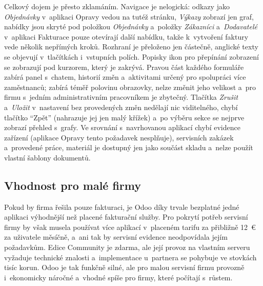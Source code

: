 Celkový dojem je přesto zklamáním. Navigace je nelogická: odkazy jako \emph{Objednávky} v~aplikaci Opravy vedou na tutéž stránku, \emph{Výkazy} zobrazí jen graf, nabídky jsou skryté pod položkou \emph{Objednávky} a~položky \emph{Zákazníci} a~\emph{Dodavatelé} v~aplikaci Fakturace pouze otevírají další nabídku, takže k~vytvoření faktury vede několik nepřímých kroků. Rozhraní je přeloženo jen částečně, anglické texty se objevují v~tlačítkách i~vstupních polích. Popisky ikon pro přepínání zobrazení se zobrazují pod kurzorem, který je zakrývá. Pravou část každého formuláře zabírá panel s~chatem, historií změn a~aktivitami určený pro spolupráci více zaměstnanců; zabírá téměř polovinu obrazovky, nelze změnit jeho velikost a~pro firmu s~jedním administrativním pracovníkem je zbytečný. Tlačítka \emph{Zrušit} a~\emph{Uložit} v~nastavení bez provedených změn nedělají nic viditelného, chybí tlačítko \enquote{Zpět} (nahrazuje jej jen malý křížek) a~po výběru sekce se nejprve zobrazí přehled s~grafy. Ve srovnání s~navrhovanou aplikací chybí evidence zařízení (aplikace Opravy tento požadavek nesplňuje), servisních zakázek a~provedené práce, materiál je dostupný jen jako součást skladu a~nelze použít vlastní šablony dokumentů.

\subsection{Vhodnost pro malé firmy}

Pokud by firma řešila pouze fakturaci, je Odoo díky trvale bezplatné jedné aplikaci výhodnější než placené fakturační služby. Pro pokrytí potřeb servisní firmy by však musela používat více aplikací v~placeném tarifu za přibližně 12~€ za uživatele měsíčně, a~ani tak by servisní evidence neodpovídala jejím požadavkům. Edice Community je zdarma, ale její provoz na vlastním serveru vyžaduje technické znalosti a~implementace u~partnera se pohybuje ve stovkách tisíc korun. Odoo je tak funkčně silné, ale pro malou servisní firmu provozně i~ekonomicky náročné a~vhodné spíše pro firmy, které počítají s~růstem.
